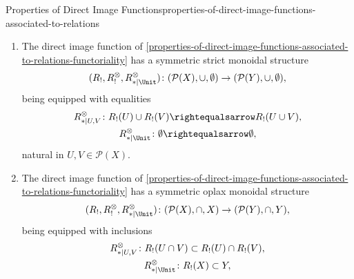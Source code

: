 \begin{proposition}{Properties of Direct Image Functions}{properties-of-direct-image-functions-associated-to-relations}
\begin{enumerate}
\[                \bigcap_{i\in I}R_{!}(U_{i}),%
            \]%
            natural in $\{U_{i}\}_{i\in I}\in\mathcal{P}(X)^{\times I}$. In particular, we have inclusions%
            \[
                \begin{gathered}
                    R_{!}(U\cap V) \subset R_{!}(U)\cap R_{!}(V),\\
                    R_{!}(X)       \subset Y,
                \end{gathered}
            \]%
            natural in $U,V\in\mathcal{P}(X)$.
        \item\label{properties-of-direct-image-functions-associated-to-relations-symmetric-strict-monoidality-with-respect-to-unions}The direct image function of \cref{properties-of-direct-image-functions-associated-to-relations-functoriality} has a symmetric strict monoidal structure
            \[
                (R_{!},R^{\otimes}_{!},R^{\otimes}_{*|\Unit})
                \colon
                (\mathcal{P}(X),\cup,\emptyset)
                \to
                (\mathcal{P}(Y),\cup,\emptyset),
            \]%
            being equipped with equalities%
            \[
                \begin{gathered}
                    R^{\otimes}_{*|U,V}   \colon R_{!}(U)\cup R_{!}(V) \rightequalsarrow R_{!}(U\cup V),\\
                    R^{\otimes}_{*|\Unit} \colon \emptyset             \rightequalsarrow \emptyset,
                \end{gathered}
            \]%
            natural in $U,V\in\mathcal{P}(X)$.
        \item\label{properties-of-direct-image-functions-associated-to-relations-symmetric-oplax-monoidality-with-respect-to-intersections}The direct image function of \cref{properties-of-direct-image-functions-associated-to-relations-functoriality} has a symmetric oplax monoidal structure
            \[
                (R_{!},R^{\otimes}_{!},R^{\otimes}_{*|\Unit})
                \colon
                (\mathcal{P}(X),\cap,X)
                \to
                (\mathcal{P}(Y),\cap,Y),
            \]%
            being equipped with inclusions%
            \[
                \begin{gathered}
                    R^{\otimes}_{*|U,V}   \colon R_{!}(U\cap V) \subset R_{!}(U)\cap R_{!}(V),\\
                    R^{\otimes}_{*|\Unit} \colon R_{!}(X)       \subset Y,

\end{gathered}\]
\end{enumerate}
\end{proposition}
